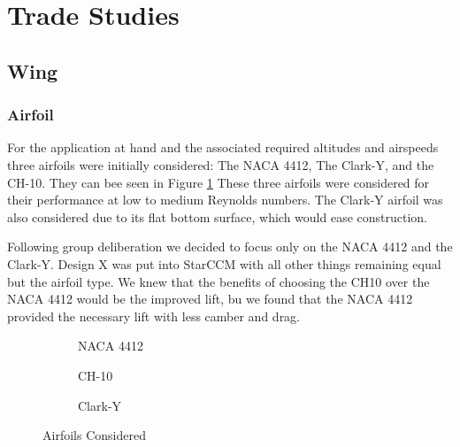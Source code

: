 \documentclass[letterpaper,12pt]{article}
\begin{document}
\section{Trade Studies}\label{sec:studies}

\subsection{Wing}\label{sec:studies:wing}

\subsubsection{Airfoil}\label{sec:studies:wing:foil} %

For the application at hand and the associated required altitudes and airspeeds three airfoils were initially considered: The NACA 4412, The Clark-Y, and the CH-10. They can bee seen in Figure \ref{fig:foils} These three airfoils were considered for their performance at low to medium Reynolds numbers. The Clark-Y airfoil was also considered due to its flat bottom surface, which would ease construction. 

Following group deliberation we decided to focus only on the NACA 4412 and the Clark-Y. Design X was put into StarCCM with all other things remaining equal but the airfoil type. We knew that the benefits of choosing the CH10 over the NACA 4412 would be the improved lift, bu we found that the NACA 4412 provided the necessary lift with less camber and drag.


\begin{figure}[htbp]
    \centering
    \begin{subfigure}[c]{.45\linewidth}
        \caption{NACA 4412}
    \end{subfigure}
    \begin{subfigure}[c]{.45\linewidth}
        \caption{CH-10}
    \end{subfigure}
    \begin{subfigure}[c]{.45\linewidth}
        \caption{Clark-Y}
    \end{subfigure}
    \caption{Airfoils Considered}
    \label{fig:foils}
\end{figure}
\end{document}
